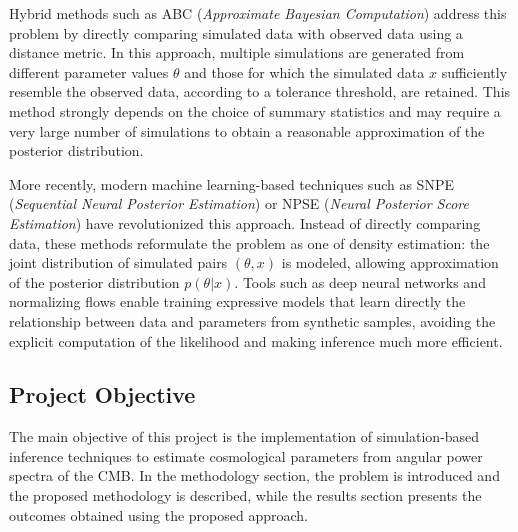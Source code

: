 Hybrid methods such as ABC (\textit{Approximate Bayesian Computation}) address this problem by directly comparing simulated data with observed data using a distance metric. In this approach, multiple simulations are generated from different parameter values \(\theta\) and those for which the simulated data \(x\) sufficiently resemble the observed data, according to a tolerance threshold, are retained. This method strongly depends on the choice of summary statistics and may require a very large number of simulations to obtain a reasonable approximation of the posterior distribution.

More recently, modern machine learning-based techniques such as SNPE (\textit{Sequential Neural Posterior Estimation}) \cite{SNPE_C} or NPSE (\textit{Neural Posterior Score Estimation}) \cite{NPSE_1} \cite{NPSE_2} have revolutionized this approach. Instead of directly comparing data, these methods reformulate the problem as one of density estimation: the joint distribution of simulated pairs \((\theta, x)\) is modeled, allowing approximation of the posterior distribution \(p(\theta|x)\). Tools such as deep neural networks and normalizing flows enable training expressive models that learn directly the relationship between data and parameters from synthetic samples, avoiding the explicit computation of the likelihood and making inference much more efficient.

\subsection{Project Objective}
The main objective of this project is the implementation of simulation-based inference techniques to estimate cosmological parameters from angular power spectra of the CMB. In the methodology section, the problem is introduced and the proposed methodology is described, while the results section presents the outcomes obtained using the proposed approach.


